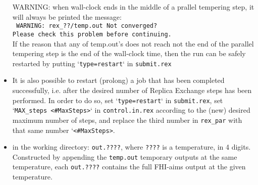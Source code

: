 \begin{itemize}
WARNING: when wall-clock ends in the middle of a prallel tempering step, it will always be printed the message:\\
\texttt{ \* WARNING: rex\_??/temp.out Not converged?\\
 Please check this problem before continuing.}\\
If the reason that any of temp.out's does not reach not the end of the parallel tempering step is the end of the wall-clock time, then the run can be safely restarted by putting `\texttt{type=restart}` in \texttt{submit.rex}

\item It is also possible to restart (prolong) a job that has been completed successfully, i.e. after the desired number of Replica Exchange steps has been performed. In order to do so, set `\texttt{type=restart}` in \texttt{submit.rex}, set `\texttt{MAX\_steps  <\#MaxSteps>}` in \texttt{control.in.rex} according to the (new) desired maximum number of steps, and replace the third number in \texttt{rex\_par} with that same number `\texttt{<\#MaxSteps>}.

\item in the working directory: \texttt{out.????}, where \texttt{????} is a temperature, in 4 digits. Constructed by appending the \texttt{temp.out} temporary outputs at the same temperature, each \texttt{out.????} contains the full FHI-aims output at the given temperature. 


\end{itemize}


